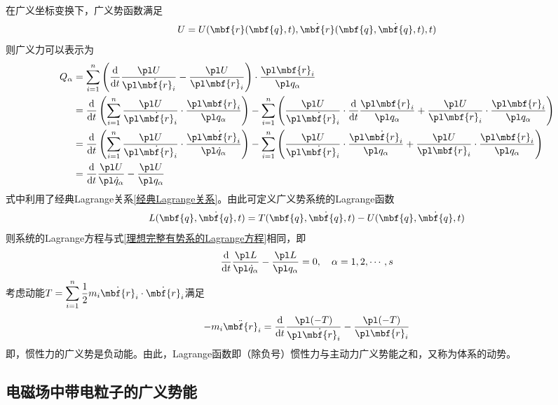 在广义坐标变换下，广义势函数满足
\begin{equation*}
	U = U(\mbf{r}(\mbf{q},t),\dot{\mbf{r}}(\mbf{q},\dot{\mbf{q}},t),t)
\end{equation*}
则广义力可以表示为
\begin{align}
	Q_\alpha & = \sum_{i=1}^n \left(\frac{\mathrm{d}}{\mathrm{d} t} \frac{\pl U}{\pl \dot{\mbf{r}}_i} - \frac{\pl U}{\pl \mbf{r}_i}\right) \cdot \frac{\pl \mbf{r}_i}{\pl q_\alpha} \nonumber \\
	& = \frac{\mathrm{d}}{\mathrm{d} t} \left(\sum_{i=1}^n \frac{\pl U}{\pl \dot{\mbf{r}}_i} \cdot \frac{\pl \mbf{r}_i}{\pl q_\alpha} \right) - \sum_{i=1}^n \left(\frac{\pl U}{\pl \dot{\mbf{r}}_i} \cdot \frac{\mathrm{d}}{\mathrm{d} t} \frac{\pl \mbf{r}_i}{\pl q_\alpha} + \frac{\pl U}{\pl \mbf{r}_i} \cdot \frac{\pl \mbf{r}_i}{\pl q_\alpha}\right) \nonumber \\
	& = \frac{\mathrm{d}}{\mathrm{d} t} \left(\sum_{i=1}^n \frac{\pl U}{\pl \dot{\mbf{r}}_i} \cdot \frac{\pl \dot{\mbf{r}}_i}{\pl \dot{q}_\alpha} \right) - \sum_{i=1}^n \left(\frac{\pl U}{\pl \dot{\mbf{r}}_i} \cdot \frac{\pl \dot{\mbf{r}}_i}{\pl q_\alpha} + \frac{\pl U}{\pl \mbf{r}_i} \cdot \frac{\pl \mbf{r}_i}{\pl q_\alpha}\right) \nonumber \\
	& = \frac{\mathrm{d}}{\mathrm{d} t} \frac{\pl U}{\pl \dot{q}_\alpha} - \frac{\pl U}{\pl q_\alpha}
	\label{广义势系统中的广义力}
\end{align}
式中利用了经典Lagrange关系\eqref{经典Lagrange关系}。由此可定义广义势系统的Lagrange函数
\begin{equation}
	L(\mbf{q},\dot{\mbf{q}},t) = T(\mbf{q},\dot{\mbf{q}},t) - U(\mbf{q},\dot{\mbf{q}},t)
\end{equation}
则系统的Lagrange方程与式\eqref{理想完整有势系的Lagrange方程}相同，即
\begin{equation}
	\frac{\mathrm{d}}{\mathrm{d}t} \frac{\pl L}{\pl \dot{q}_\alpha} - \frac{\pl L}{\pl q_\alpha} = 0,\quad \alpha = 1,2,\cdots,s
\end{equation}
考虑动能$\displaystyle T = \sum_{i=1}^n \frac12 m_i \dot{\mbf{r}}_i \cdot \dot{\mbf{r}}_i$满足
\begin{equation*}
	-m_i \ddot{\mbf{r}}_i = \frac{\mathrm{d}}{\mathrm{d} t} \frac{\pl (-T)}{\pl \dot{\mbf{r}}_i} - \frac{\pl (-T)}{\pl \mbf{r}_i}
\end{equation*}
即，惯性力的广义势是负动能。由此，Lagrange函数即（除负号）惯性力与主动力广义势能之和，又称为体系的{\heiti 动势}。

\subsection{电磁场中带电粒子的广义势能}

